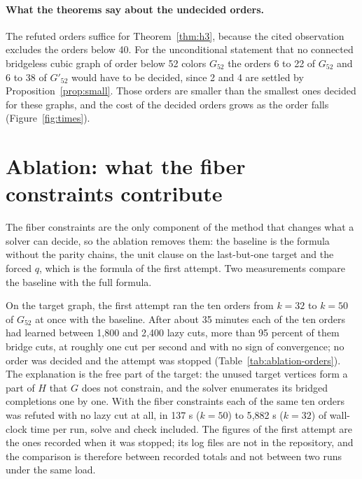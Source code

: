 \documentclass[11pt]{article}
\theoremstyle{definition}
\theoremstyle{remark}
\newcommand{\Ga}{G_{52}}
\newcommand{\Gb}{G'_{52}}
\begin{document}
\paragraph{What the theorems say about the undecided orders.} The refuted orders suffice for Theorem~\ref{thm:h3}, because the cited observation excludes the orders below 40. For the unconditional statement that no connected bridgeless cubic graph of order below 52 colors $\Ga$ the orders 6 to 22 of $\Ga$ and 6 to 38 of $\Gb$ would
have to be decided, since 2 and 4 are settled by Proposition~\ref{prop:small}. Those orders are smaller than the smallest ones decided for these graphs, and the cost of the decided orders grows as the order falls (Figure~\ref{fig:times}).

\section{Ablation: what the fiber constraints contribute}\label{sec:ablation}

The fiber constraints are the only component of the method that changes what a solver can decide, so the ablation removes them: the baseline is the formula without the parity chains, the unit clause on the last-but-one target and the forced $q$, which is the formula of the first attempt. Two measurements compare the baseline with the full formula.

On the target graph, the first attempt ran the ten orders from $k = 32$ to $k = 50$ of $\Ga$ at once with the baseline. After about 35 minutes each of the ten orders had learned between 1{,}800 and 2{,}400 lazy cuts, more than 95 percent of them bridge cuts, at roughly one cut per second and with no sign of convergence; no order was decided and the attempt was stopped (Table~\ref{tab:ablation-orders}).
The explanation is the free part of the target: the unused target vertices form a part of $H$ that $G$ does not constrain, and the solver enumerates its bridged completions one by one. With the fiber constraints each of the same ten orders was refuted with no lazy cut at all, in 137 s ($k = 50$) to 5{,}882 s ($k = 32$) of wall-clock time per run, solve and check included. The figures of the first attempt are the ones recorded
when it was stopped; its log files are not in the repository, and the comparison is therefore between recorded totals and not between two runs under the same load.
\end{document}
